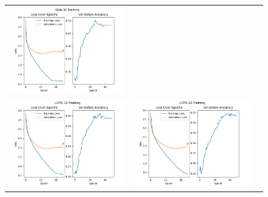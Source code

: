 \documentclass{article}
\begin{document}
\begin{enumerate}[label=1\alph*. ]
\begin{figure}[htb]
\begin{tabularx}{\textwidth}{XXX}
          \includegraphics{images_p1/RNN_30_training_new.png}   \\
          \includegraphics{images_p1/LSTM_10_training_new.png} &
          \includegraphics{images_p1/LSTM_20_training_new.png} &

\end{tabularx}
\end{figure}
\end{enumerate}
\end{document}
